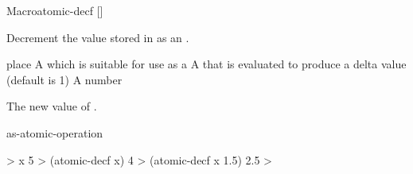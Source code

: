 \begin{functiondoc}{Macro}{atomic-decf}{ []
      \returns{} }
%

\fnsyntax \fnpurpose Decrement the value stored in  as an
.

\fnpackage {}

\fnmodule {}

\fnargs
\begin{args}{place}
\arg[place] A  which is suitable for use as a
 A  that is evaluated to produce a delta value
(default is 1)
 A number
\end{args}

\fnreturns The new value of . 

\begin{alsos}{as-atomic-operation}
\end{alsos}

\fnexamples
%
\W\supp
\begin{example}
  > x
  5
  > (atomic-decf x)
  4
  > (atomic-decf x 1.5)
  2.5
  >
\end{example}

\end{functiondoc}


